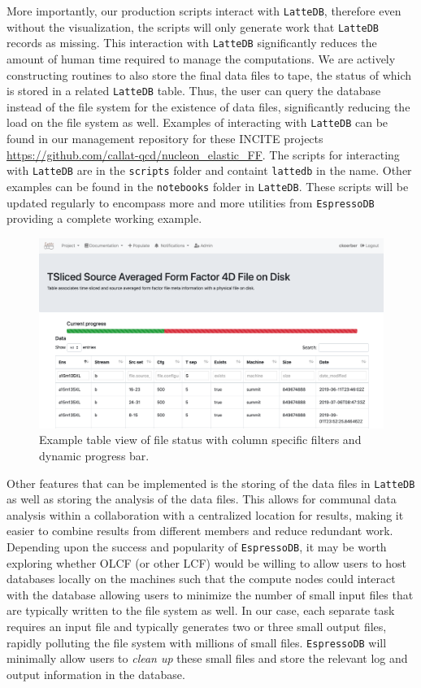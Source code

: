 More importantly, our production scripts interact with \texttt{LatteDB},
therefore even without the visualization, the scripts will only generate
work that \texttt{LatteDB} records as missing. This interaction with
\texttt{LatteDB} significantly reduces the amount of human time required
to manage the computations. We are actively constructing routines to
also store the final data files to tape, the status of which is stored
in a related \texttt{LatteDB} table. Thus, the user can query the
database instead of the file system for the existence of data files,
significantly reducing the load on the file system as well.
Examples of interacting with \texttt{LatteDB} can be found in
our management repository for these INCITE projects
\url{https://github.com/callat-qcd/nucleon_elastic_FF}.
The scripts for interacting with \texttt{LatteDB} are in the \texttt{scripts} folder and containt \texttt{lattedb} in the name.
Other examples can be found in the \texttt{notebooks} folder in
\texttt{LatteDB}. These scripts will be updated regularly to encompass
more and more utilities from \texttt{EspressoDB} providing a complete
working example.

\begin{figure}
\centering
\includegraphics{../_static/lattedb-example.png}
\caption{Example table view of file status with column specific filters
and dynamic progress bar.}
\end{figure}

Other features that can be implemented is the storing of the data files
in \texttt{LatteDB} as well as storing the analysis of the data files.
This allows for communal data analysis within a collaboration with a
centralized location for results, making it easier to combine results
from different members and reduce redundant work. Depending upon the
success and popularity of \texttt{EspressoDB}, it may be worth exploring
whether OLCF (or other LCF) would be willing to allow users to host
databases locally on the machines such that the compute nodes could
interact with the database allowing users to minimize the number of
small input files that are typically written to the file system as well.
In our case, each separate task requires an input file and typically
generates two or three small output files, rapidly polluting the file
system with millions of small files. \texttt{EspressoDB} will minimally
allow users to \emph{clean up} these small files and store the relevant
log and output information in the database.
